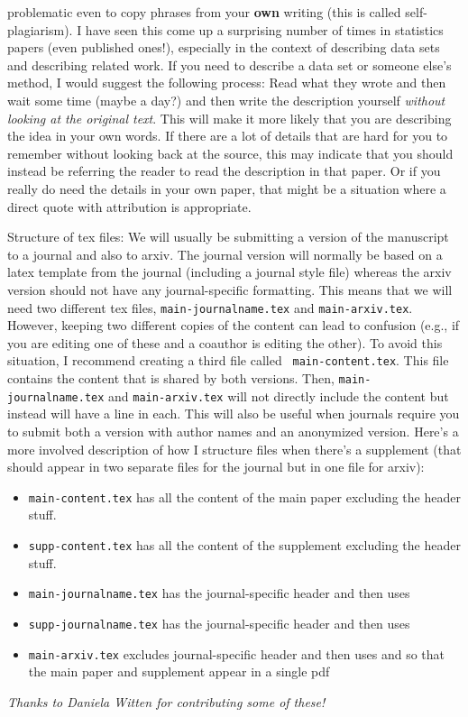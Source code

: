 \documentclass[11pt]{article}
\begin{document}
\begin{todolist}
  problematic even to copy phrases from your {\bf own} writing (this
  is called self-plagiarism).  I have seen this come up a surprising
  number of times in statistics papers (even published ones!), especially in the context of
  describing data sets and describing related work.  If you need to describe a data set or someone
  else's method, I would suggest the following process:  Read what
  they wrote and then wait some time (maybe a day?) and then write the
  description yourself {\em without looking at the original text}.
  This will make it more likely that you are describing the idea in
  your own words.  If there are a lot of details that are hard for you
  to remember without looking back at the source, this may indicate
  that you should instead be referring the reader to read the
  description in that paper.  Or if you really do need the details in
  your own paper, that might be a situation where a direct quote with
  attribution is appropriate.
  \item Structure of tex files: We will usually be submitting a
    version of the manuscript to a journal and also to arxiv.  The
    journal version will normally be based on a latex template from
    the journal (including a journal style file) whereas the arxiv
    version should not have any journal-specific formatting.  This
    means that we will need two different tex files, {\tt main-journalname.tex}
    and {\tt main-arxiv.tex}.  However, keeping two different copies
    of the content can lead to confusion (e.g., if you are editing one
    of these and a coauthor is editing the other).  To avoid this
    situation, I recommend creating a third file called {\tt
      main-content.tex}.  This file contains the content that is
    shared by both versions.  Then,  {\tt main-journalname.tex}
    and {\tt main-arxiv.tex} will not directly include the content but
    instead will have a line \verb++ in each.
    This will also be useful when journals require you to submit both
    a version with author names and an anonymized version.
    Here's a more involved description of how I structure files when
    there's a supplement (that should appear in two separate files for
    the journal but in one file for arxiv):
    \begin{itemize}
    \item {\tt main-content.tex} has all the content of the main
      paper excluding the header stuff.
    \item {\tt supp-content.tex} has all the content of the supplement excluding the header stuff.
\item  {\tt main-journalname.tex} has the journal-specific header and then uses \verb++
\item  {\tt supp-journalname.tex} has the journal-specific header and then uses \verb++
\item  {\tt main-arxiv.tex} excludes journal-specific header and then uses \verb++ and \verb++ so that the main paper and supplement appear in a single pdf
    \end{itemize}
 
\end{todolist}

{\em Thanks to Daniela Witten for contributing some of these!}
\end{document}
